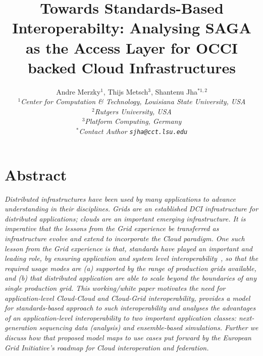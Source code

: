 \documentclass[10pt,conference,final,letterpaper,twoside,twocolumn,]{IEEEtran}
\begin{document}
\title{Towards Standards-Based Interoperabilty: Analysing SAGA as the
  Access Layer for OCCI backed Cloud Infrastructures}

\author{Andre Merzky$^{1}$, Thijs Metsch$^{3}$, Shantenu Jha$^{*1,2}$\\
  \small{\emph{$^{1}$Center for Computation \& Technology, Louisiana State University, USA}}\\
  \small{\emph{$^{2}$Rutgers University, USA}}\\
  \small{\emph{$^{3}$Platform Computing, Germany}}\\
  \small{\emph{$^{*}$Contact Author \texttt{sjha@cct.lsu.edu}}} }

\maketitle

  \section*{Abstract} {\it Distributed infrastructures have been used
  by many applications to advance understanding in their disciplines.
  Grids are an established DCI infrastructure for distributed
  applications; clouds are an important emerging infrastructure. It is
  imperative that the lessons from the Grid experience be transferred
  as infrastructure evolve and extend to incorporate the Cloud
  paradigm.  One such lesson from the Grid experience is that,
  standards have played an important and leading role, by ensuring
  application and system level interoperability~\cite{saga_gin}, so
  that the required usage modes are (a) supported by the range of
  production grids available, and (b) that distributed application are
  able to scale beyond the boundaries of any single production grid. 
  This working/white paper motivates the need for application-level
  Cloud-Cloud and Cloud-Grid interoperability, provides a model for
  standards-based approach to such interoperability and analyses the
  advantages of an application-level interoperability to two important
  application classes: next-generation sequencing data (analysis) and
  ensemble-based simulations.  Further we discuss how that proposed
  model maps to use cases put forward by the European Grid
  Initiative's roadmap for Cloud interoperation and federation.}

\end{document}
